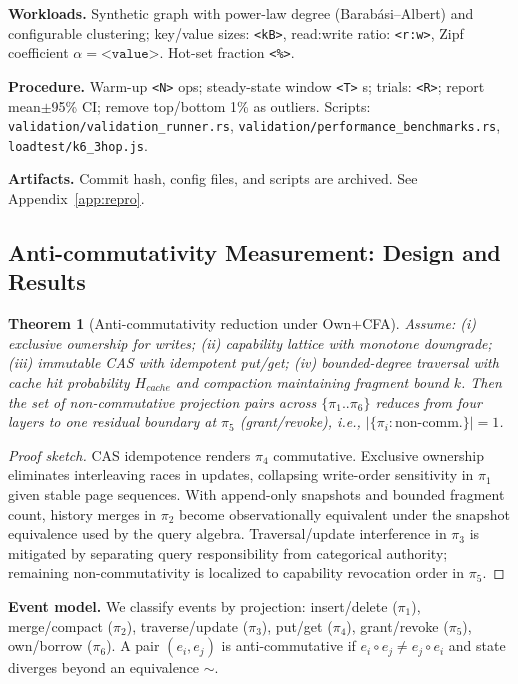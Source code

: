 \documentclass[10pt]{article}
\newtheorem{theorem}{Theorem}
\begin{document}
\textbf{Workloads.} Synthetic graph with power-law degree (Barab\'asi--Albert) and configurable clustering; key/value sizes: \texttt{<kB>}, read:write ratio: \texttt{<r:w>}, Zipf coefficient $\alpha=\texttt{<value>}$. Hot-set fraction \texttt{<\%>}.

\textbf{Procedure.} Warm-up \texttt{<N>} ops; steady-state window \texttt{<T>} s; trials: \texttt{<R>}; report mean$\pm$95\% CI; remove top/bottom 1\% as outliers. Scripts: \texttt{validation/validation_runner.rs}, \texttt{validation/performance_benchmarks.rs}, \texttt{loadtest/k6_3hop.js}.

\textbf{Artifacts.} Commit hash, config files, and scripts are archived. See Appendix~\ref{app:repro}.

\subsection{Anti-commutativity Measurement: Design and Results}
\begin{theorem}[Anti-commutativity reduction under Own+CFA]
Assume: (i) exclusive ownership for writes; (ii) capability lattice with monotone downgrade; (iii) immutable CAS with idempotent put/get; (iv) bounded-degree traversal with cache hit probability $H_{cache}$ and compaction maintaining fragment bound $k$. Then the set of non-commutative projection pairs across $\{\pi_1..\pi_6\}$ reduces from four layers to one residual boundary at $\pi_5$ (grant/revoke), i.e., $|\{\pi_i:\text{non-comm.}\}|=1$.
\end{theorem}
\begin{proof}[Proof sketch]
CAS idempotence renders $\pi_4$ commutative. Exclusive ownership eliminates interleaving races in updates, collapsing write-order sensitivity in $\pi_1$ given stable page sequences. With append-only snapshots and bounded fragment count, history merges in $\pi_2$ become observationally equivalent under the snapshot equivalence used by the query algebra. Traversal/update interference in $\pi_3$ is mitigated by separating query responsibility from categorical authority; remaining non-commutativity is localized to capability revocation order in $\pi_5$.
\end{proof}
\textbf{Event model.} We classify events by projection: insert/delete ($\pi_1$), merge/compact ($\pi_2$), traverse/update ($\pi_3$), put/get ($\pi_4$), grant/revoke ($\pi_5$), own/borrow ($\pi_6$). A pair $(e_i,e_j)$ is anti-commutative if $e_i\circ e_j\ne e_j\circ e_i$ and state diverges beyond an equivalence $\sim$.
\end{document}
